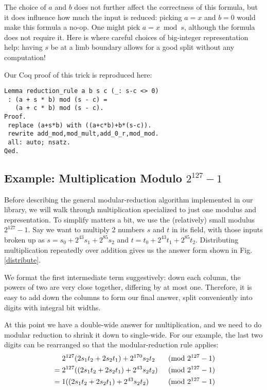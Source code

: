 \documentclass[conference,letterpaper]{IEEEtran}
\begin{document}
The choice of $a$ and $b$ does not further affect the correctness of this formula, but it does influence how much the input is reduced: picking $a=x$ and $b=0$ would make this formula a no-op.
One might pick $a = x \bmod s$, although the formula does not require it.
Here is where careful choices of big-integer representation help: having $s$ be at a limb boundary allows for a good split without any computation!

Our Coq proof of this trick is reproduced here:
{%
\begin{verbatim}
Lemma reduction_rule a b s c (_: s-c <> 0)
 : (a + s * b) mod (s - c) =
   (a + c * b) mod (s - c).
Proof.
 replace (a+s*b) with ((a+c*b)+b*(s-c)).
 rewrite add_mod,mod_mult,add_0_r,mod_mod.
 all: auto; nsatz.
Qed.
\end{verbatim}}

\subsection{Example: Multiplication Modulo $2^{127}-1$}

Before describing the general modular-reduction algorithm implemented in our library, we will walk through multiplication specialized to just one modulus and representation.
To simplify matters a bit, we use the (relatively) small modulus $2^{127} - 1$.
Say we want to multiply 2 numbers $s$ and $t$ in its field, with those inputs broken up as $s = s_0 + 2^{43} s_1 + 2^{85} s_2$ and $t = t_0 + 2^{43} t_1 + 2^{85} t_2$.
Distributing multiplication repeatedly over addition gives us the answer form shown in Fig. \ref{distribute}.

We format the first intermediate term suggestively: down each column, the powers of two are very close together, differing by at most one.
Therefore, it is easy to add down the columns to form our final answer, split conveniently into digits with integral bit widths.

At this point we have a double-wide answer for multiplication, and we need to do modular reduction to shrink it down to single-wide.
For our example, the last two digits can be rearranged so that the modular-reduction rule applies:
\begin{align*}
    &\phantom{\vphantom{.}=\vphantom{.}} 2^{127}(2s_1t_2 + 2s_2t_1) + 2^{170}s_2t_2 & \pmod{2^{127}-1} \\
    &= 2^{127}((2s_1t_2 + 2s_2t_1) + 2^{43}s_2t_2) & \pmod{2^{127}-1} \\
    &= 1((2s_1t_2 + 2s_2t_1) + 2^{43}s_2t_2) & \pmod{2^{127}-1}
\end{align*}
\end{document}

